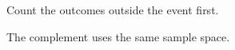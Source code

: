 \documentclass[aspectratio=169,11pt]{beamer}
\begin{document}
\begin{frame}
Count the outcomes outside the event first.

The complement uses the same sample space.
\end{frame}
\end{document}
